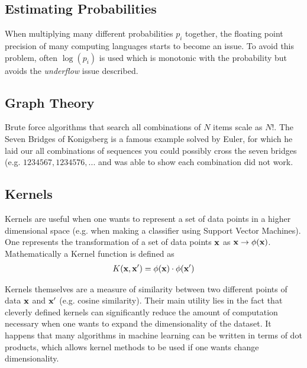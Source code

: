 \subsection{Estimating Probabilities}
When multiplying many different probabilities $p_i$ together, the floating point precision of many computing languages starts to become an issue. To avoid this problem, often $\log(p_i)$ is used which is monotonic with the probability but avoids the \textit{underflow} issue described.

\subsection{Graph Theory}
Brute force algorithms that search all combinations of $N$ items scale as $N!$. The Seven Bridges of Konigsberg is a famous example solved by Euler, for which he laid our all combinations of sequences you could possibly cross the seven bridges (e.g. $1234567, 1234576,...$ and was able to show each combination did not work.


\subsection{Kernels}
Kernels are useful when one wants to represent a set of data points in a higher dimensional space (e.g. when making a classifier using Support Vector Machines). One represents the transformation of a set of data points $\textbf{x}$ as $\textbf{x}\rightarrow \phi(\textbf{x})$. Mathematically a Kernel function is defined as
\begin{align}
	K(\textbf{x},\textbf{x}') = \phi(\textbf{x})\cdot \phi(\textbf{x}')
\end{align}

 Kernels themselves are a measure of similarity between two different points of data $\textbf{x}$ and $\textbf{x}'$ (e.g. cosine similarity). Their main utility lies in the fact that cleverly defined kernels can significantly reduce the amount of computation necessary when one wants to expand the dimensionality of the dataset. It happens that many algorithms in machine learning can be written in terms of dot products, which allows kernel methods to be used if one wants change dimensionality.

